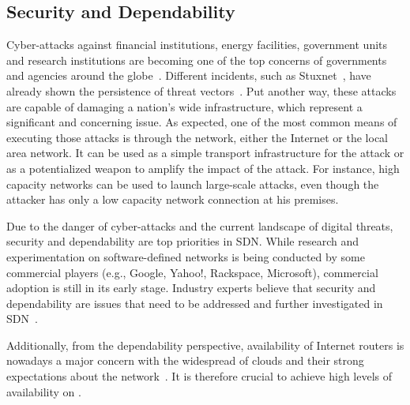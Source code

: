 
\subsection{Security and Dependability}
\label{secSecurity}

Cyber-attacks against financial institutions, energy facilities, government units and research institutions 
are becoming one of the top concerns of governments and agencies around the globe~\cite{marchetti2012,amin2012,nicholson2012,choo2011,kushner2013,perez-pena2013}.
Different incidents, such as Stuxnet~\cite{kushner2013}, have already shown the persistence of threat
vectors~\cite{tankard2011}. Put another way, these attacks are capable of damaging a nation's wide 
infrastructure, which represent a significant and concerning issue. As expected, one of the most common means 
of executing those attacks is through the network, either the Internet or the local area network. It can be used 
as a simple transport infrastructure for the attack or as a potentialized weapon to amplify the impact of the 
attack. For instance, high capacity networks can be used to launch large-scale attacks, even though the attacker 
has only a low capacity network connection at his premises.

Due to the danger of cyber-attacks and the current landscape of digital threats, security and dependability are 
top priorities in SDN. While research and experimentation on software-defined networks is being conducted by 
some commercial players (e.g., Google, Yahoo!, Rackspace, Microsoft), commercial adoption is still in its early 
stage. Industry experts believe that security and dependability are issues that need to be addressed and further 
investigated in SDN~\cite{kreutz2013,sorensen2012,kerner2013}.

Additionally, from the dependability perspective, availability of Internet routers is nowadays a major concern 
with the widespread of clouds and their strong expectations about the network~\cite{agapi2011}. It is 
therefore crucial to achieve high levels of availability on . 

